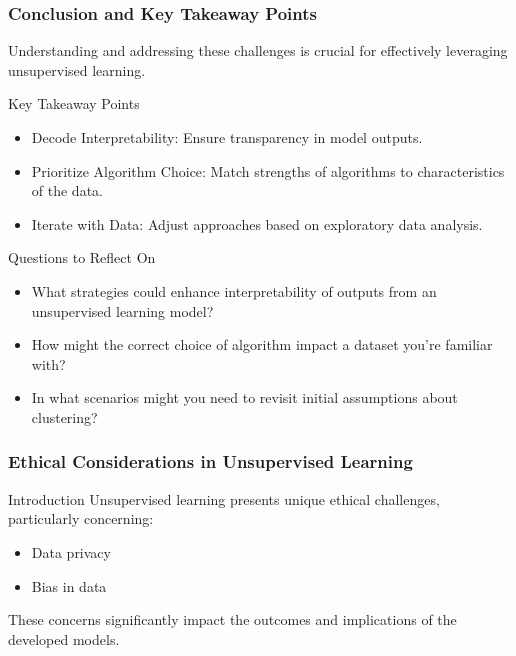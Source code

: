 \documentclass[aspectratio=169]{beamer}
\begin{document}
\begin{frame}[fragile]
    \frametitle{Conclusion and Key Takeaway Points}
    Understanding and addressing these challenges is crucial for effectively leveraging unsupervised learning. 

    \begin{block}{Key Takeaway Points}
        \begin{itemize}
            \item Decode Interpretability: Ensure transparency in model outputs.
            \item Prioritize Algorithm Choice: Match strengths of algorithms to characteristics of the data.
            \item Iterate with Data: Adjust approaches based on exploratory data analysis.
        \end{itemize}
    \end{block}
    
    \begin{block}{Questions to Reflect On}
        \begin{itemize}
            \item What strategies could enhance interpretability of outputs from an unsupervised learning model?
            \item How might the correct choice of algorithm impact a dataset you're familiar with?
            \item In what scenarios might you need to revisit initial assumptions about clustering?
        \end{itemize}
    \end{block}
\end{frame}

\begin{frame}[fragile]
    \frametitle{Ethical Considerations in Unsupervised Learning}
    \begin{block}{Introduction}
        Unsupervised learning presents unique ethical challenges, particularly concerning:
        \begin{itemize}
            \item Data privacy
            \item Bias in data
        \end{itemize}
        These concerns significantly impact the outcomes and implications of the developed models.
    \end{block}
\end{frame}
\end{document}
